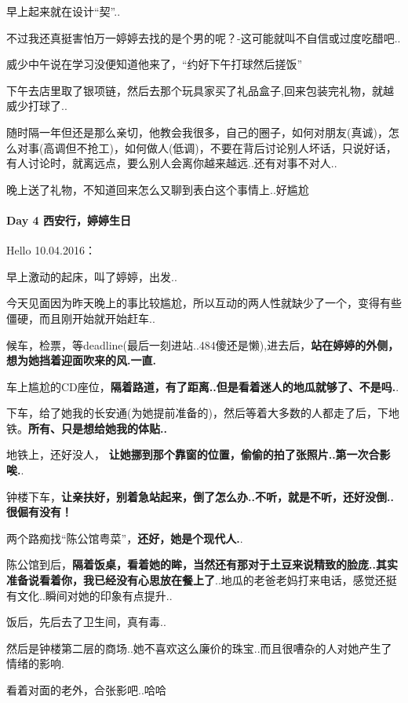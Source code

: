 \documentclass[UTF8,a4paper,8pt]{ctexbook}
\begin{document}
	 	 早上起来就在设计“契”..
	 	 
	 	 不过我还真挺害怕万一婷婷去找的是个男的呢？-这可能就叫不自信或过度吃醋吧..
	 	 
	 	 威少中午说在学习没便知道他来了，“约好下午打球然后搓饭”
	 	 
	 	 下午去店里取了银项链，然后去那个玩具家买了礼品盒子,回来包装完礼物，就越威少打球了..
	 	 
	 	 随时隔一年但还是那么亲切，他教会我很多，自己的圈子，如何对朋友(真诚)，怎么对事(高调但不抢工)，如何做人(低调)，不要在背后讨论别人坏话，只说好话，有人讨论时，就离远点，要么别人会离你越来越远..还有对事不对人..
	 	 
	 	 晚上送了礼物，不知道回来怎么又聊到表白这个事情上..好尴尬
 	 \paragraph{Day 4    西安行，婷婷生日   \quad     }
	 	 Hello 10.04.2016：
	 	 
	 	 早上激动的起床，叫了婷婷，出发..
	 	 
	 	 今天见面因为昨天晚上的事比较尴尬，所以互动的两人性就缺少了一个，变得有些僵硬，而且刚开始就开始赶车..
	 	 
	 	 候车，检票，等deadline(最后一刻进站..484傻还是懒),进去后，\textbf{站在婷婷的外侧，想为她挡着迎面吹来的风.一直.}
	 	 
	 	 车上尴尬的CD座位，\textbf{隔着路道，有了距离..但是看着迷人的地瓜就够了、不是吗.}.
	 	 
	 	 下车，给了她我的长安通(为她提前准备的)，然后等着大多数的人都走了后，下地铁。\textbf{所有、只是想给她我的体贴..}
	 	 
	 	 地铁上，还好没人， \textbf{让她挪到那个靠窗的位置，偷偷的拍了张照片..第一次合影唉.}.
	 	 
	 	 钟楼下车，\textbf{让亲扶好，别着急站起来，倒了怎么办..不听，就是不听，还好没倒..很倔有没有！}
	 	 
	 	 两个路痴找“陈公馆粤菜”，\textbf{还好，她是个现代人.}.
	 	 
	 	 陈公馆到后，\textbf{隔着饭桌，看着她的眸，当然还有那对于土豆来说精致的脸庞..其实准备说看着你，我已经没有心思放在餐上了}..地瓜的老爸老妈打来电话，感觉还挺有文化..瞬间对她的印象有点提升..
	 	 
	 	 饭后，先后去了卫生间，真有毒..
	 	 
	 	 然后是钟楼第二层的商场..她不喜欢这么廉价的珠宝..而且很嘈杂的人对她产生了情绪的影响. 
	 	 
	 	 看着对面的老外，合张影吧..哈哈
	 	 
\end{document}
